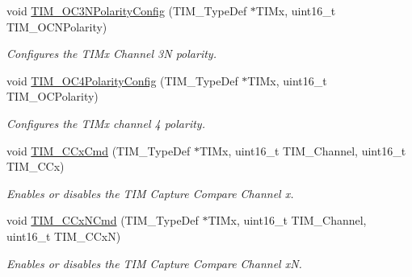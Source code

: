 \begin{DoxyCompactItemize}
void \hyperlink{group___t_i_m___group2_gac710acc5b682e892584fc6f089f61dc2}{T\-I\-M\-\_\-\-O\-C3\-N\-Polarity\-Config} (T\-I\-M\-\_\-\-Type\-Def $\ast$T\-I\-Mx, uint16\-\_\-t T\-I\-M\-\_\-\-O\-C\-N\-Polarity)
\begin{DoxyCompactList}\small\item\em Configures the T\-I\-Mx Channel 3\-N polarity. \end{DoxyCompactList}\item 
void \hyperlink{group___t_i_m___group2_gad678410f7c7244f83daad93ce9d1056e}{T\-I\-M\-\_\-\-O\-C4\-Polarity\-Config} (T\-I\-M\-\_\-\-Type\-Def $\ast$T\-I\-Mx, uint16\-\_\-t T\-I\-M\-\_\-\-O\-C\-Polarity)
\begin{DoxyCompactList}\small\item\em Configures the T\-I\-Mx channel 4 polarity. \end{DoxyCompactList}\item 
void \hyperlink{group___t_i_m___group2_ga3ecc4647d9ede261beb5e0535cf29ebb}{T\-I\-M\-\_\-\-C\-Cx\-Cmd} (T\-I\-M\-\_\-\-Type\-Def $\ast$T\-I\-Mx, uint16\-\_\-t T\-I\-M\-\_\-\-Channel, uint16\-\_\-t T\-I\-M\-\_\-\-C\-Cx)
\begin{DoxyCompactList}\small\item\em Enables or disables the T\-I\-M Capture Compare Channel x. \end{DoxyCompactList}\item 
void \hyperlink{group___t_i_m___group2_ga304ff7c8a1615498da749bf2507e9f2b}{T\-I\-M\-\_\-\-C\-Cx\-N\-Cmd} (T\-I\-M\-\_\-\-Type\-Def $\ast$T\-I\-Mx, uint16\-\_\-t T\-I\-M\-\_\-\-Channel, uint16\-\_\-t T\-I\-M\-\_\-\-C\-Cx\-N)
\begin{DoxyCompactList}\small\item\em Enables or disables the T\-I\-M Capture Compare Channel x\-N. \end{DoxyCompactList}\end{DoxyCompactItemize}


